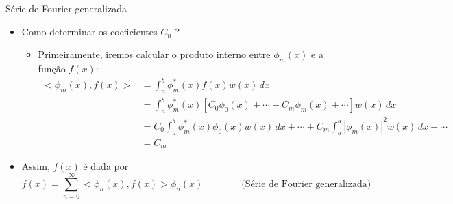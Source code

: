      \begin{slide}[toc=]{Série de Fourier generalizada}
	     \begin{itemize}
		     \item Como determinar os coeficientes $C_n$ ?
			     \begin{itemize}
				     \item Primeiramente, iremos calcular o produto interno entre $\phi_m(x)$ e a função $f(x)$:
					     \begin{align*}
						     <\phi_m(x), f(x)> &= \int_a^b \phi_m^\ast (x) f(x) w(x)\, dx\\
						                       &= \int_a^b \phi_m^\ast (x) \left [C_0\phi_0(x) + \cdots + C_m\phi_m(x) + \cdots \right ]w(x)\, dx\\
								       &= C_0\int_a^b \phi_m^\ast(x)\phi_0(x)w(x)\, dx +  \cdots + C_m\int_a^b |\phi_m(x)|^2w(x)\, dx+ \cdots\\
								       &= C_m
					     \end{align*}
			     \end{itemize}
		     \item Assim, $f(x)$ é dada por
			     \begin{equation*}
				     f(x) = \sum_{n=0}^\infty <\phi_n(x),f(x)>\phi_n(x)\qquad\qquad\text{(Série de Fourier generalizada)}
			     \end{equation*}
			     
	     \end{itemize}
     \end{slide}

	
